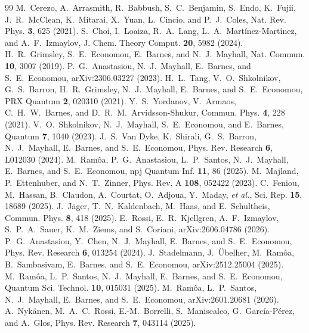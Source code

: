 \documentclass[aps,pra,reprint,superscriptaddress,nofootinbib]{revtex4-2}
\begin{document}
\begin{thebibliography}{99}
 M.~Cerezo, A.~Arrasmith, R.~Babbush, S.~C.~Benjamin, S.~Endo, K.~Fujii, J.~R.~McClean, K.~Mitarai, X.~Yuan, L.~Cincio, and P.~J.~Coles, Nat. Rev. Phys. \textbf{3}, 625 (2021).
 S.~Choi, I.~Loaiza, R.~A.~Lang, L.~A.~Mart\'inez-Mart\'inez, and A.~F.~Izmaylov, J. Chem. Theory Comput. \textbf{20}, 5982 (2024).
 H.~R.~Grimsley, S.~E.~Economou, E.~Barnes, and N.~J.~Mayhall, Nat. Commun. \textbf{10}, 3007 (2019).
 P.~G.~Anastasiou, N.~J.~Mayhall, E.~Barnes, and S.~E.~Economou, arXiv:2306.03227 (2023).
 H.~L.~Tang, V.~O.~Shkolnikov, G.~S.~Barron, H.~R.~Grimsley, N.~J.~Mayhall, E.~Barnes, and S.~E.~Economou, PRX Quantum \textbf{2}, 020310 (2021).
 Y.~S.~Yordanov, V.~Armaos, C.~H.~W.~Barnes, and D.~R.~M.~Arvidsson-Shukur, Commun. Phys. \textbf{4}, 228 (2021).
 V.~O.~Shkolnikov, N.~J.~Mayhall, S.~E.~Economou, and E.~Barnes, Quantum \textbf{7}, 1040 (2023).
 J.~S.~Van Dyke, K.~Shirali, G.~S.~Barron, N.~J.~Mayhall, E.~Barnes, and S.~E.~Economou, Phys. Rev. Research \textbf{6}, L012030 (2024).
 M.~Ram\^oa, P.~G.~Anastasiou, L.~P.~Santos, N.~J.~Mayhall, E.~Barnes, and S.~E.~Economou, npj Quantum Inf. \textbf{11}, 86 (2025).
 M.~Majland, P.~Ettenhuber, and N.~T.~Zinner, Phys. Rev. A \textbf{108}, 052422 (2023).
 C.~Feniou, M.~Hassan, B.~Claudon, A.~Courtat, O.~Adjoua, Y.~Maday, \textit{et al.}, Sci. Rep. \textbf{15}, 18689 (2025).
 J.~J\"ager, T.~N.~Kaldenbach, M.~Haas, and E.~Schultheis, Commun. Phys. \textbf{8}, 418 (2025).
 E.~Rossi, E.~R.~Kjellgren, A.~F.~Izmaylov, S.~P.~A.~Sauer, K.~M.~Ziems, and S.~Coriani, arXiv:2606.04786 (2026).
 P.~G.~Anastasiou, Y.~Chen, N.~J.~Mayhall, E.~Barnes, and S.~E.~Economou, Phys. Rev. Research \textbf{6}, 013254 (2024).
 J.~Stadelmann, J.~\"Ubelher, M.~Ram\^oa, B.~Sambasivam, E.~Barnes, and S.~E.~Economou, arXiv:2512.25004 (2025).
 M.~Ram\^oa, L.~P.~Santos, N.~J.~Mayhall, E.~Barnes, and S.~E.~Economou, Quantum Sci. Technol. \textbf{10}, 015031 (2025).
 M.~Ram\^oa, L.~P.~Santos, N.~J.~Mayhall, E.~Barnes, and S.~E.~Economou, arXiv:2601.20681 (2026).
 A.~Nyk\"anen, M.~A.~C.~Rossi, E.-M.~Borrelli, S.~Maniscalco, G.~Garc\'ia-P\'erez, and A.~Glos, Phys. Rev. Research \textbf{7}, 043114 (2025).

\end{thebibliography}
\end{document}
